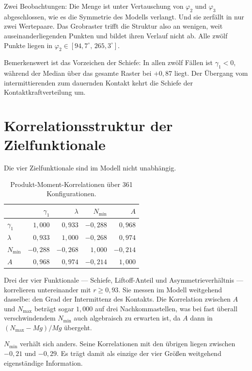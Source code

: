 \documentclass[12pt,a4paper]{report}
\begin{document}
Zwei Beobachtungen: Die Menge ist unter Vertauschung von $\varphi_2$ und
$\varphi_3$ abgeschlossen, wie es die Symmetrie des Modells verlangt. Und
sie zerfällt in nur zwei Wertepaare. Das Grobraster trifft die Struktur
also an wenigen, weit auseinanderliegenden Punkten und bildet ihren
Verlauf nicht ab. Alle zwölf Punkte liegen in
$\varphi_2 \in [94{,}7^\circ,\, 265{,}3^\circ]$.

Bemerkenswert ist das Vorzeichen der Schiefe: In allen zwölf Fällen ist
$\gamma_1 < 0$, während der Median über das gesamte Raster bei $+0{,}87$
liegt. Der Übergang vom intermittierenden zum dauernden Kontakt kehrt die
Schiefe der Kontaktkraftverteilung um.

\section{Korrelationsstruktur der Zielfunktionale}
\label{sec:korrelation}

Die vier Zielfunktionale sind im Modell nicht unabhängig.

\begin{table}[htbp]
  \centering
  \begin{tabular}{lrrrr}
    \hline
     & $\gamma_1$ & $\lambda$ & $N_{\min}$ & $A$ \\
    \hline
    $\gamma_1$   & $1{,}000$ & $0{,}933$ & $-0{,}288$ & $0{,}968$ \\
    $\lambda$    & $0{,}933$ & $1{,}000$ & $-0{,}268$ & $0{,}974$ \\
    $N_{\min}$   & $-0{,}288$ & $-0{,}268$ & $1{,}000$ & $-0{,}214$ \\
    $A$          & $0{,}968$ & $0{,}974$ & $-0{,}214$ & $1{,}000$ \\
    \hline
  \end{tabular}
  \caption{Produkt-Moment-Korrelationen über 361 Konfigurationen.}
  \label{tab:korrelation}
\end{table}

Drei der vier Funktionale --- Schiefe, Liftoff-Anteil und
Asymmetrieverhältnis --- korrelieren untereinander mit
$r \geq 0{,}93$. Sie messen im Modell weitgehend dasselbe: den Grad der
Intermittenz des Kontakts. Die Korrelation zwischen $A$ und $N_{\max}$
beträgt sogar $1{,}000$ auf drei Nachkommastellen, was bei fast überall
verschwindendem $N_{\min}$ auch algebraisch zu erwarten ist, da $A$ dann
in $(N_{\max}-Mg)/Mg$ übergeht.

$N_{\min}$ verhält sich anders. Seine Korrelationen mit den übrigen
liegen zwischen $-0{,}21$ und $-0{,}29$. Es trägt damit als einzige der
vier Größen weitgehend eigenständige Information.
\end{document}
